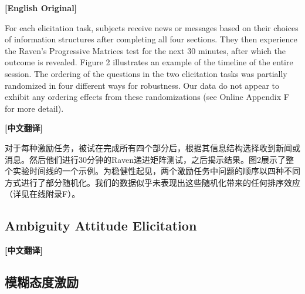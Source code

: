 \documentclass[12pt,a4paper]{ctexart}
\newenvironment{original}{%
  \par\medskip\noindent\textbf{[English Original]}\par\smallskip
  \color{black}\small
}{%
  \par\medskip
}
\newenvironment{translation}{%
  \par\noindent\textbf{[中文翻译]}\par\smallskip
  \color{blue}\small
}{%
  \par\bigskip
}
\theoremstyle{definition}
\theoremstyle{remark}
\begin{document}
\begin{original}
For each elicitation task, subjects receive news or messages based on their choices of information structures after completing all four sections. They then experience the Raven's Progressive Matrices test for the next 30 minutes, after which the outcome is revealed. Figure 2 illustrates an example of the timeline of the entire session. The ordering of the questions in the two elicitation tasks was partially randomized in four different ways for robustness. Our data do not appear to exhibit any ordering effects from these randomizations (see Online Appendix F for more detail).
\end{original}
\begin{translation}
对于每种激励任务，被试在完成所有四个部分后，根据其信息结构选择收到新闻或消息。然后他们进行30分钟的Raven递进矩阵测试，之后揭示结果。图2展示了整个实验时间线的一个示例。为稳健性起见，两个激励任务中问题的顺序以四种不同方式进行了部分随机化。我们的数据似乎未表现出这些随机化带来的任何排序效应（详见在线附录F）。
\end{translation}

\subsection{Ambiguity Attitude Elicitation}
\begin{translation}
\subsection*{模糊态度激励}
\end{translation}
\end{document}
